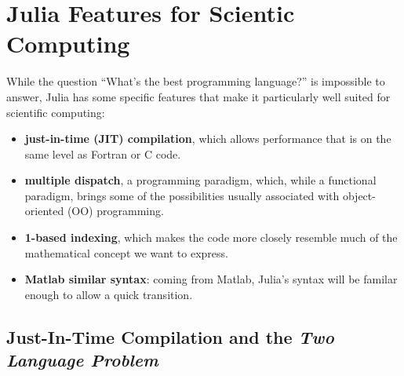 \documentclass[
  a4paper,
  DIV=11,
  numbers=noendperiod,
  oneside]{scrreprt}
\author{}
\date{}
\begin{document}
\ifdefined\Shaded\renewenvironment{Shaded}{\begin{tcolorbox}[breakable, interior hidden, borderline west={3pt}{0pt}{shadecolor}, frame hidden, boxrule=0pt, enhanced, sharp corners]}{\end{tcolorbox}}\fi

\hypertarget{julia-features-for-scientic-computing}{%
\chapter{Julia Features for Scientic
Computing}\label{julia-features-for-scientic-computing}}

While the question ``What's the best programming language?'' is
impossible to answer, Julia has some specific features that make
it particularly well suited for scientific computing:

\begin{itemize}
\item
  \textbf{just-in-time (JIT) compilation}, which allows performance that
  is on the same level as Fortran or C code.
\item
  \textbf{multiple dispatch}, a programming paradigm, which, while a
  functional paradigm, brings some of the possibilities usually
  associated with object-oriented (OO) programming.
\item
  \textbf{1-based indexing}, which makes the code more closely
  resemble much of the mathematical concept we want to
  express.
\item
  \textbf{Matlab similar syntax}: coming from Matlab, Julia's syntax
  will be familar enough to allow a quick transition.
\end{itemize}

\hypertarget{just-in-time-compilation-and-the-two-language-problem}{%
\section{\texorpdfstring{Just-In-Time Compilation and the \emph{Two
Language
Problem}}{Just-In-Time Compilation and the Two Language Problem}}\label{just-in-time-compilation-and-the-two-language-problem}}
\end{document}
